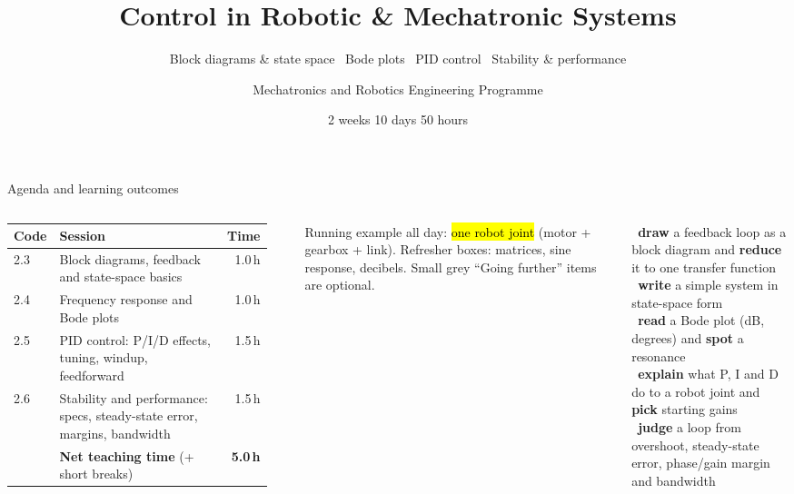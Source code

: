 \documentclass[aspectratio=169,10pt]{beamer}
\title[Control in Robotic Systems]{Control in Robotic \& Mechatronic Systems}
\subtitle{Block diagrams \& state space \textbullet\ Bode plots \textbullet\ PID control \textbullet\ Stability \& performance}
\author{Mechatronics and Robotics Engineering Programme}
\institute{Week 1 \textperiodcentered{} Day 3}
\date{2 weeks \textperiodcentered{} 10 days \textperiodcentered{} 50 hours}
\begin{document}
\begin{frame}[plain]\titlepage\end{frame}

\begin{frame}{Agenda and learning outcomes}
\begin{columns}[T]
\footnotesize
\begin{tabular}{@{}lp{4.4cm}r@{}}
\toprule
\textbf{Code} & \textbf{Session} & \textbf{Time}\\
\midrule
2.3 & Block diagrams, feedback and state-space basics & 1.0\,h\\
2.4 & Frequency response and Bode plots & 1.0\,h\\
2.5 & PID control: P/I/D effects, tuning, windup, feedforward & 1.5\,h\\
2.6 & Stability and performance: specs, steady-state error, margins, bandwidth & 1.5\,h\\
\midrule
 & \textbf{Net teaching time} (+ short breaks) & \textbf{5.0\,h}\\
\bottomrule
\end{tabular}\\[2mm]
\begin{notebox}
Running example all day: \hl{one robot joint} (motor + gearbox + link). Refresher boxes: matrices, sine response, decibels. Small grey ``Going further'' items are optional.
\end{notebox}
\begin{defbox}
\footnotesize
\checkitem\ \textbf{draw} a feedback loop as a block diagram and \textbf{reduce} it to one transfer function\\[2pt]
\checkitem\ \textbf{write} a simple system in state-space form\\[2pt]
\checkitem\ \textbf{read} a Bode plot (dB, degrees) and \textbf{spot} a resonance\\[2pt]
\checkitem\ \textbf{explain} what P, I and D do to a robot joint and \textbf{pick} starting gains\\[2pt]
\checkitem\ \textbf{judge} a loop from overshoot, steady-state error, phase/gain margin and bandwidth
\end{defbox}
\end{columns}
\end{frame}
\end{document}
